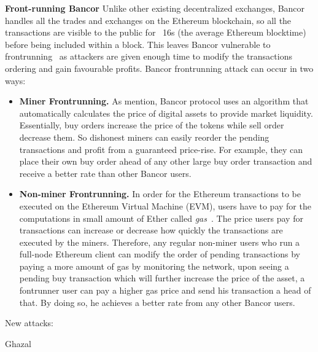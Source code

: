 \par\noindent\textbf{Front-running Bancor} Unlike other existing decentralized exchanges, Bancor handles all the trades and exchanges on the Ethereum blockchain, so all the transactions are visible to the public for ~16s (the average Ethereum blocktime) before being included within a block. This leaves Bancor vulnerable to frontrunning~\cite{BancorIs7:online} as attackers are given enough time to modify the transactions ordering and gain favourable profits. Bancor frontrunning attack can occur in two ways:
\begin{itemize}
\item {\textbf{Miner Frontrunning.}} As mention, Bancor protocol uses an algorithm that automatically calculates the price of digital assets to provide market liquidity. Essentially, buy orders increase the price of the tokens while sell order decrease them. So  dishonest miners can easily reorder the pending transactions and  profit from a guaranteed price-rise. For example, they can place their own buy order ahead of any other large buy order transaction and receive a better rate than other Bancor users. 
\item {\textbf{Non-miner Frontrunning.}} In order for the Ethereum transactions to be executed on the Ethereum Virtual Machine (EVM), users have to pay for the computations in small amount of Ether called \textit{gas}~\cite{AccountT67:online}.  The price users pay for transactions can increase or decrease how quickly the transactions are executed by the miners. Therefore, any regular non-miner users who run a full-node Ethereum client can modify the order of pending transactions by paying a more amount of gas \ie by monitoring the network, upon seeing a  pending buy transaction which will further increase the price of the asset, a fontrunner user can pay a higher gas price and send his transaction a head of that. By doing so, he achieves a better rate from any other Bancor users.
\end{itemize}

 
 

 
 
New attacks:\par\noindent
Ghazal\par\noindent

